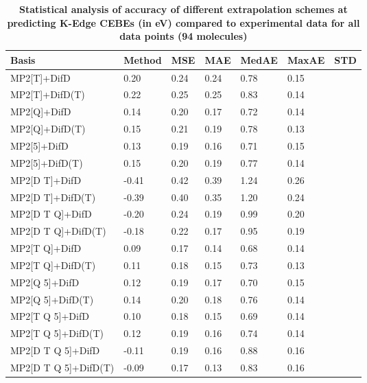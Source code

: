 \begin{table}
  \caption{\textbf{Statistical analysis of accuracy of different extrapolation schemes at predicting K-Edge CEBEs (in eV) compared to experimental data for all data points (94 molecules)}}
  \begin{tabular}{l l l l l l l }
    \toprule
    \textbf{Basis} & \textbf{Method} & \textbf{MSE} & \textbf{MAE} & \textbf{MedAE} & \textbf{MaxAE} & \textbf{STD} \\ 
    \midrule
    MP2[T]+DifD & 0.20 & 0.24 & 0.24 & 0.78 & 0.15 \\ 
    MP2[T]+DifD(T) & 0.22 & 0.25 & 0.25 & 0.83 & 0.14 \\ 
    MP2[Q]+DifD & 0.14 & 0.20 & 0.17 & 0.72 & 0.14 \\ 
    MP2[Q]+DifD(T) & 0.15 & 0.21 & 0.19 & 0.78 & 0.13 \\ 
    MP2[5]+DifD & 0.13 & 0.19 & 0.16 & 0.71 & 0.15 \\ 
    MP2[5]+DifD(T) & 0.15 & 0.20 & 0.19 & 0.77 & 0.14 \\ 
    MP2[D T]+DifD & -0.41 & 0.42 & 0.39 & 1.24 & 0.26 \\ 
    MP2[D T]+DifD(T) & -0.39 & 0.40 & 0.35 & 1.20 & 0.24 \\ 
    MP2[D T Q]+DifD & -0.20 & 0.24 & 0.19 & 0.99 & 0.20 \\ 
    MP2[D T Q]+DifD(T) & -0.18 & 0.22 & 0.17 & 0.95 & 0.19 \\ 
    MP2[T Q]+DifD & 0.09 & 0.17 & 0.14 & 0.68 & 0.14 \\ 
    MP2[T Q]+DifD(T) & 0.11 & 0.18 & 0.15 & 0.73 & 0.13 \\ 
    MP2[Q 5]+DifD & 0.12 & 0.19 & 0.17 & 0.70 & 0.15 \\ 
    MP2[Q 5]+DifD(T) & 0.14 & 0.20 & 0.18 & 0.76 & 0.14 \\ 
    MP2[T Q 5]+DifD & 0.10 & 0.18 & 0.15 & 0.69 & 0.14 \\ 
    MP2[T Q 5]+DifD(T) & 0.12 & 0.19 & 0.16 & 0.74 & 0.14 \\ 
    MP2[D T Q 5]+DifD & -0.11 & 0.19 & 0.16 & 0.88 & 0.16 \\ 
    MP2[D T Q 5]+DifD(T) & -0.09 & 0.17 & 0.13 & 0.83 & 0.16 \\ 
    \bottomrule
  \end{tabular}
\end{table}

